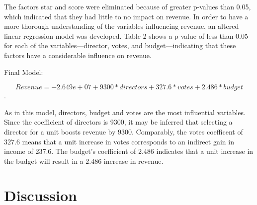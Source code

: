 \documentclass[12pt]{article}
\begin{document}
The factors star and score were eliminated because of greater p-values than 0.05, 
which indicated that they had little to no impact on revenue. In order to have a 
more thorough understanding of the variables influencing revenue, an altered linear 
regression model was developed. Table 2 shows a p-value of less than 0.05 for each 
of the variables—director, votes, and budget—indicating that these factors have a
considerable influence on revenue.

Final Model: 

$$Revenue = -2.649e+07 +9300*directors + 327.6*votes + 2.486*budget$$.

As in this model, directors, budget and votes are the most influential variables.
Since the coefficient of directors is 9300, it may be inferred that selecting a 
director for a unit boosts revenue by 9300. Comparably, the votes coefficent of 
327.6 means that a unit increase in votes corresponds to an indirect gain in income 
of 237.6. The budget's coefficient of 2.486 indicates that a unit increase in the 
budget will result in a 2.486 increase in revenue.


\section{Discussion}
\label{sec:dis}





\end{document}
